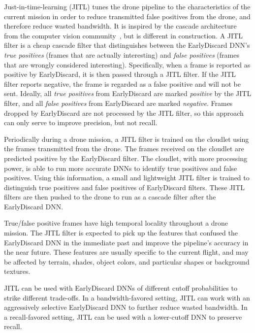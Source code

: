 Just-in-time-learning  (JITL) tunes the drone pipeline to the characteristics of
 the current mission in order to reduce transmitted false positives from the
 drone, and therefore reduce wasted bandwidth.  It is inspired by the cascade
 architecture from the computer vision community~\cite{Viola2001}, but is
 different in construction. A JITL filter is a cheap cascade filter that
 distinguishes between the EarlyDiscard DNN's \emph{true positives} (frames that
 are actually interesting) and \emph{false positives} (frames that are wrongly
 considered interesting).  Specifically, when a frame is reported as positive by
 EarlyDiscard, it is then passed through a JITL filter. If the JITL filter
 reports negative, the frame is regarded as a false positive and will not be
 sent. Ideally, all \emph{true positives} from EarlyDiscard are marked
 \emph{positive} by the JITL filter, and all \emph{false positives} from 
 EarlyDiscard are marked \emph{negative}.  Frames dropped by EarlyDiscard are
 not processed by the JITL filter, so this approach can only serve to improve
 precision, but not recall.


Periodically during a drone mission, a JITL filter is trained on the cloudlet
using the frames transmitted from the drone.  The frames received on the
cloudlet are predicted positive by the EarlyDiscard filter. The cloudlet, with
more processing power, is able to run more accurate DNNs to identify true
positives and false positives. Using this information, a small and lightweight
JITL filter is trained to distinguish true positives and false positives of
EarlyDiscard filters. These JITL filters are then pushed to the drone to run as
a cascade filter after the EarlyDiscard DNN.

True/false positive frames have high temporal locality throughout a drone
mission. The JITL filter is expected to pick up the features that confused the
EarlyDiscard DNN in the immediate past and improve the pipeline's accuracy in
the near future. These features are usually specific to the current flight, and
may be affected by terrain, shades, object colors, and particular shapes or
background textures.

JITL can be used with EarlyDiscard DNNs of different cutoff probabilities to
strike different trade-offs. In a bandwidth-favored setting, JITL can work with
an aggressively selective EarlyDiscard DNN to further reduce wasted bandwidth. In
a recall-favored setting, JITL can be used with a lower-cutoff DNN to preserve
recall.

